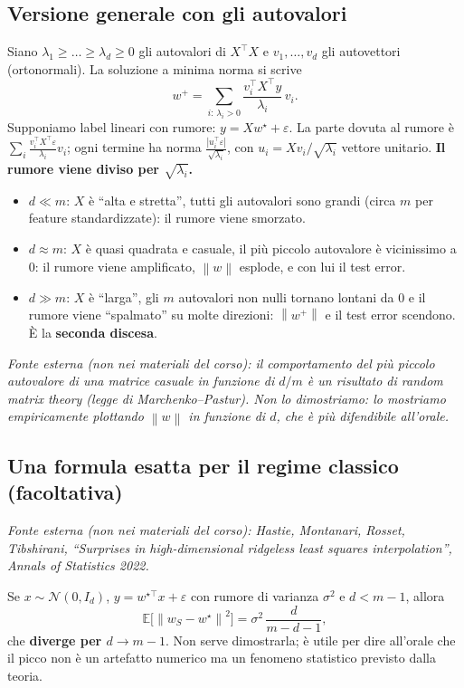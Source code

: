 \documentclass[11pt,a4paper]{article}
\newcommand{\E}{\mathbb{E}}
\newcommand{\norm}[1]{\left\lVert #1 \right\rVert}
\newcommand{\esterna}[1]{\par\noindent\textit{Fonte esterna (non nei materiali del corso): #1}\par\smallskip}
\begin{document}
\subsection{Versione generale con gli autovalori}
Siano $\lambda_1 \ge \dots \ge \lambda_d \ge 0$ gli autovalori di $X^\top X$ e $v_1,\dots,v_d$ gli autovettori
(ortonormali). La soluzione a minima norma si scrive
\[
  w^{+} = \sum_{i:\,\lambda_i > 0} \frac{v_i^\top X^\top y}{\lambda_i}\, v_i .
\]
Supponiamo label lineari con rumore: $y = Xw^\star + \varepsilon$. La parte dovuta al rumore è
$\sum_i \frac{v_i^\top X^\top \varepsilon}{\lambda_i} v_i$; ogni termine ha norma
$\frac{|u_i^\top \varepsilon|}{\sqrt{\lambda_i}}$, con $u_i = Xv_i/\sqrt{\lambda_i}$ vettore unitario.
\textbf{Il rumore viene diviso per $\sqrt{\lambda_i}$.}
\begin{itemize}
  \item $d \ll m$: $X$ è ``alta e stretta'', tutti gli autovalori sono grandi (circa $m$ per feature standardizzate):
        il rumore viene smorzato.
  \item $d \approx m$: $X$ è quasi quadrata e casuale, il più piccolo autovalore è vicinissimo a $0$:
        il rumore viene amplificato, $\norm{w}$ esplode, e con lui il test error.
  \item $d \gg m$: $X$ è ``larga'', gli $m$ autovalori non nulli tornano lontani da $0$ e il rumore viene ``spalmato'' su
        molte direzioni: $\norm{w^{+}}$ e il test error scendono. È la \textbf{seconda discesa}.
\end{itemize}
\esterna{il comportamento del più piccolo autovalore di una matrice casuale in funzione di $d/m$ è un risultato di random
matrix theory (legge di Marchenko--Pastur). Non lo dimostriamo: lo mostriamo empiricamente plottando $\norm{w}$
in funzione di $d$, che è più difendibile all'orale.}

\subsection{Una formula esatta per il regime classico (facoltativa)}
\esterna{Hastie, Montanari, Rosset, Tibshirani, ``Surprises in high-dimensional ridgeless least squares interpolation'',
Annals of Statistics 2022.}
Se $x \sim \mathcal{N}(0, I_d)$, $y = w^{\star\top}x + \varepsilon$ con rumore di varianza $\sigma^2$ e $d < m-1$, allora
\[
  \E\bigl[\norm{w_S - w^\star}^2\bigr] = \sigma^2\,\frac{d}{m - d - 1},
\]
che \textbf{diverge per $d \to m-1$}. Non serve dimostrarla; è utile per dire all'orale che il picco non è un artefatto
numerico ma un fenomeno statistico previsto dalla teoria.
\end{document}
